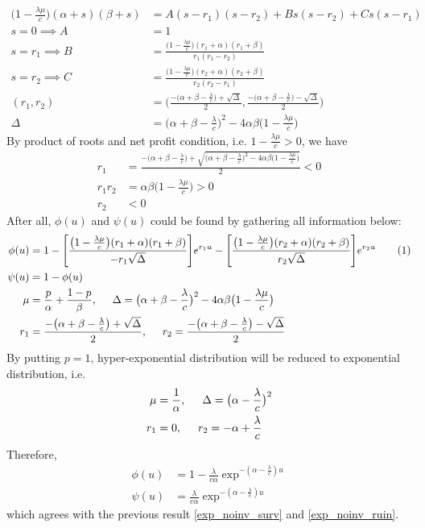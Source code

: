 \documentclass[12pt]{article}
\newcommand\numberthis{\addtocounter{equation}{1}\tag{\theequation}}
\begin{document}
\begin{align*}
    \big(1-\frac{\lambda\mu}{c}\big)(\alpha+s)(\beta+s)&=A(s-r_1)(s-r_2)+Bs(s-r_2)+Cs(s-r_1)\\
    s=0 \implies A&=1\\
    s=r_1 \implies B&=\frac{\big(1-\frac{\lambda\mu}{c}\big)(r_1+\alpha)(r_1+\beta)}{r_1(r_1-r_2)}\\
    s=r_2 \implies C&=\frac{\big(1-\frac{\lambda\mu}{c}\big)(r_2+\alpha)(r_2+\beta)}{r_2(r_2-r_1)}\\
    (r_1,r_2)&=\bigg(\frac{-\big(\alpha+\beta-\frac{\lambda}{c}\big)+\sqrt{\Delta}}{2},\frac{-\big(\alpha+\beta-\frac{\lambda}{c}\big)-\sqrt{\Delta}}{2}\bigg)\\
    \Delta &= \big(\alpha+\beta-\frac{\lambda}{c}\big)^2-4\alpha\beta\big(1-\frac{\lambda\mu}{c}\big)
\end{align*}
By product of roots and net profit condition, i.e.  \(1-\frac{\lambda\mu}{c}>0\), we have
\begin{align*}
    r_1&=\frac{-\big(\alpha+\beta-\frac{\lambda}{c}\big)+\sqrt{\big(\alpha+\beta-\frac{\lambda}{c}\big)^2-4\alpha\beta\big(1-\frac{\lambda\mu}{c}\big)}}{2}<0\\
    r_1 r_2&=\alpha\beta\big(1-\frac{\lambda\mu}{c}\big)>0\\ 
    r_2&<0
\end{align*}
After all, \(\phi(u)\) and \(\psi(u)\) could be found by gathering all information below:
\begin{align*}
    \phi(u)&=1-\Bigg[\frac{\big(1-\frac{\lambda\mu}{c}\big)(r_1+\alpha)(r_1+\beta)}{-r_1\sqrt{\Delta}}\Bigg]e^{r_1u}-\Bigg[\frac{\big(1-\frac{\lambda\mu}{c}\big)(r_2+\alpha)(r_2+\beta)}{r_2\sqrt{\Delta}}\Bigg]e^{r_2u}\numberthis\label{hyperexp_surv}\\
    \psi(u)&=1-\phi(u)\\
    \mu&=\frac{p}{\alpha}+\frac{1-p}{\beta},
    \hspace{0.5cm}
    \Delta = \big(\alpha+\beta-\frac{\lambda}{c}\big)^2-4\alpha\beta\big(1-\frac{\lambda\mu}{c}\big)\\
    r_1&=\frac{-\big(\alpha+\beta-\frac{\lambda}{c}\big)+\sqrt{\Delta}}{2},
    \hspace{0.5cm}
    r_2=\frac{-\big(\alpha+\beta-\frac{\lambda}{c}\big)-\sqrt{\Delta}}{2}
\end{align*}
By putting \(p=1\), hyper-exponential distribution will be reduced to exponential distribution, i.e.
\begin{align*}
    \mu&=\frac{1}{\alpha},
    \hspace{0.5cm}
    \Delta=\big(\alpha-\frac{\lambda}{c}\big)^2\\
    r_1&=0,
    \hspace{0.5cm}
    r_2=-\alpha+\frac{\lambda}{c}
\end{align*}
Therefore,
\begin{align}
    \phi(u)&=1-\frac{\lambda}{c\alpha}\exp^{-(\alpha-\frac{\lambda}{c})u}
    \label{hyper-exp-surv}\\
    \psi(u)&=\frac{\lambda}{c\alpha}\exp^{-(\alpha-\frac{\lambda}{c})u}
    \label{hyper-exp-ruin}
\end{align}
which agrees with the previous result \eqref{exp_noinv_surv} and \eqref{exp_noinv_ruin}.
\end{document}
